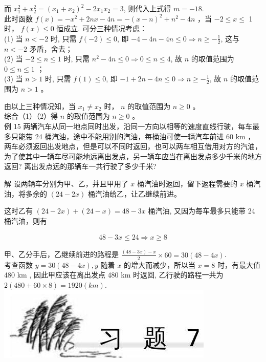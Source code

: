 \documentclass[10pt]{article}
\begin{document}
而 $x_{1}^{2}+x_{2}^{2}=\left(x_{1}+x_{2}\right)^{2}-2 x_{1} x_{2}=3$, 则代入上式得 $m=-18$.\\
此时函数 $f(x)=-x^{2}+2 n x-4 n=-(x-n)^{2}+n^{2}-4 n$ ，当 $-2 \leqslant x \leqslant$ 1 时， $f(x) \leqslant 0$ 恒成立. 可分三种情况考虑：\\
(1) 当 $n<-2$ 时, 只需 $f(-2) \leqslant 0$, 即 $-4-4 n-4 n \leqslant 0 \Rightarrow n \geqslant-\frac{1}{2}$, 这与 $n<-2$ 矛盾，舍去；\\
(2) 当 $-2 \leqslant n \leqslant 1$ 时, 只需 $n^{2}-4 n \leqslant 0 \Rightarrow 0 \leqslant n \leqslant 4$, 故 $n$ 的取值范围为 $0 \leqslant n \leqslant 1$ ；\\
(3) 当 $n>1$ 时, 只需 $f(1) \leqslant 0$, 即 $-1+2 n-4 n \leqslant 0 \Rightarrow n \geqslant-\frac{1}{2}$, 故 $n$ 的取值范围为 $n>1$ 。

由以上三种情况知，当 $x_{1} \neq x_{2}$ 时， $n$ 的取值范围为 $n \geqslant 0$ 。\\
综合（1）（2）得 $n$ 的取值范围为 $n \geqslant 0$ 。\\
例 15 两辆汽车从同一地点同时出发，沿同一方向以相等的速度直线行驶，每车最多只能带 24 桶汽油，途中不能用别的汽油，每桶油可使一辆汽车前进 60 km ，两车必须返回出发地点，但是可以不同时返回，也可以两车相互借用对方的汽油，为了使其中一辆车尽可能地远离出发点，另一辆车应当在离出发点多少千米的地方返回? 离出发点远的那辆车一共行驶了多少千米?

解 设两辆车分别为甲、乙，并且甲用了 $x$ 桶汽油时返回，留下返程需要的 $x$ 桶汽油，将多余的 $(24-2 x)$ 桶汽油给乙，让乙继续前进。

这时乙有 $(24-2 x)+(24-x)=48-3 x$ 桶汽油, 又因为每车最多只能带 24 桶汽油，则有

\begin{align*}
48-3 x \leqslant 24 \Rightarrow x \geqslant 8
\end{align*}

甲、乙分手后，乙继续前进的路程是 $\frac{(48-3 x)-x}{2} \times 60=30(48-4 x)$.\\
考查函数 $y=30(48-4 x), y$ 随着 $x$ 的增大而减少，所以当 $x=8$ 时，有最大值 480 km , 因此甲应该在离出发点 480 km 时返回, 乙行驶的路程一共为 $2(480+60 \times 8)=1920(k m)$.\\
\includegraphics[max width=\textwidth, center]{2024_10_30_1bf34f7aeb61f11d11d3g-104}
\end{document}
